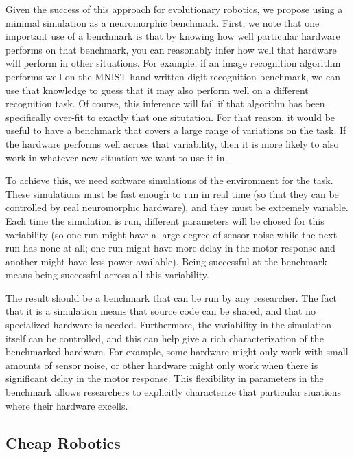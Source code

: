 \documentclass{frontiersSCNS} %
\begin{document}
Given the success of this approach for evolutionary robotics, we propose
using a minimal simulation as a neuromorphic benchmark.  First, we note that
one important use of a benchmark is that by knowing how well particular
hardware performs on that benchmark, you can reasonably infer how well
that hardware will perform in other situations.  For example, if an image recognition
algorithm performs well on the MNIST hand-written digit recognition
benchmark, we can use that knowledge to guess that it may also perform well on
a different recognition task.  Of course, this inference will fail if that
algorithn has been specifically over-fit to exactly that one situtation.  For
that reason, it would be useful to have a benchmark that covers a large range
of variations on the task.  If the hardware performs well across that
variability, then it is more likely to also work in whatever new situation we
want to use it in.

To achieve this, we need software simulations of the environment for the task.
These simulations
must be fast enough to run in real time (so that they can be controlled by
real neuromorphic hardware), and they must be extremely variable.  Each time
the simulation is run, different parameters will be chosed for this variability
(so one run might have a large degree of sensor noise while the next run has
none at all; one run might have more delay in the motor response and another
might have less power available).  Being successful at the benchmark means
being successful across all this variability.  

The result should be a benchmark that can be run by any researcher.  The fact
that it is a simulation means that source code can be shared, and that no
specialized hardware is needed.  Furthermore, the variability in the simulation
itself can be controlled, and this can help give a rich characterization of
the benchmarked hardware.  For example, some hardware might only work with
small amounts of sensor noise, or other hardware might only work when there
is significant delay in the motor response.  This flexibility in parameters
in the benchmark allows researchers to explicitly characterize that particular
siuations where their hardware excells.  

\subsection{Cheap Robotics}
\end{document}
